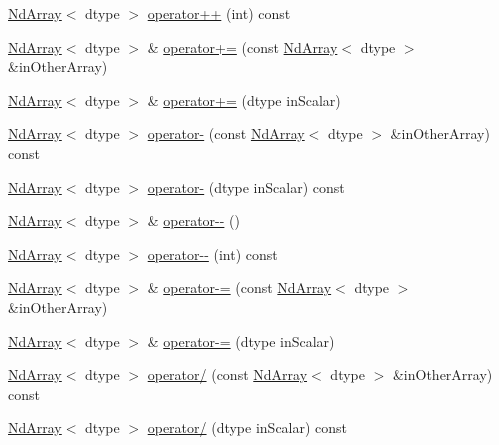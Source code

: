 \begin{DoxyCompactItemize}
\mbox{\hyperlink{class_num_c_1_1_nd_array}{Nd\+Array}}$<$ dtype $>$ \mbox{\hyperlink{class_num_c_1_1_nd_array_a47f9898e6fbe353942d90ed1f37ff79a}{operator++}} (int) const
\item 
\mbox{\hyperlink{class_num_c_1_1_nd_array}{Nd\+Array}}$<$ dtype $>$ \& \mbox{\hyperlink{class_num_c_1_1_nd_array_ada038e83835f7cdcb8173ab7e40a7805}{operator+=}} (const \mbox{\hyperlink{class_num_c_1_1_nd_array}{Nd\+Array}}$<$ dtype $>$ \&in\+Other\+Array)
\item 
\mbox{\hyperlink{class_num_c_1_1_nd_array}{Nd\+Array}}$<$ dtype $>$ \& \mbox{\hyperlink{class_num_c_1_1_nd_array_adf334fdf113d91cea91d7b8bf68b7291}{operator+=}} (dtype in\+Scalar)
\item 
\mbox{\hyperlink{class_num_c_1_1_nd_array}{Nd\+Array}}$<$ dtype $>$ \mbox{\hyperlink{class_num_c_1_1_nd_array_aa5625d7239485a21fd2cc59cec55dfb2}{operator-\/}} (const \mbox{\hyperlink{class_num_c_1_1_nd_array}{Nd\+Array}}$<$ dtype $>$ \&in\+Other\+Array) const
\item 
\mbox{\hyperlink{class_num_c_1_1_nd_array}{Nd\+Array}}$<$ dtype $>$ \mbox{\hyperlink{class_num_c_1_1_nd_array_a3a7f3f151033d72f08d1a0875e7f0c7f}{operator-\/}} (dtype in\+Scalar) const
\item 
\mbox{\hyperlink{class_num_c_1_1_nd_array}{Nd\+Array}}$<$ dtype $>$ \& \mbox{\hyperlink{class_num_c_1_1_nd_array_a3570e7df7c2202a6a8a5f5770f132ba3}{operator-\/-\/}} ()
\item 
\mbox{\hyperlink{class_num_c_1_1_nd_array}{Nd\+Array}}$<$ dtype $>$ \mbox{\hyperlink{class_num_c_1_1_nd_array_ae2cf6f24f8c46ac4b7409b09ecc69b0f}{operator-\/-\/}} (int) const
\item 
\mbox{\hyperlink{class_num_c_1_1_nd_array}{Nd\+Array}}$<$ dtype $>$ \& \mbox{\hyperlink{class_num_c_1_1_nd_array_a2ac18779cb518cfa4dcdff53065426e7}{operator-\/=}} (const \mbox{\hyperlink{class_num_c_1_1_nd_array}{Nd\+Array}}$<$ dtype $>$ \&in\+Other\+Array)
\item 
\mbox{\hyperlink{class_num_c_1_1_nd_array}{Nd\+Array}}$<$ dtype $>$ \& \mbox{\hyperlink{class_num_c_1_1_nd_array_a96520616f12f0a65f380aabd0e8a8e4e}{operator-\/=}} (dtype in\+Scalar)
\item 
\mbox{\hyperlink{class_num_c_1_1_nd_array}{Nd\+Array}}$<$ dtype $>$ \mbox{\hyperlink{class_num_c_1_1_nd_array_a931a3c3251279020beab2c1f198283a7}{operator/}} (const \mbox{\hyperlink{class_num_c_1_1_nd_array}{Nd\+Array}}$<$ dtype $>$ \&in\+Other\+Array) const
\item 
\mbox{\hyperlink{class_num_c_1_1_nd_array}{Nd\+Array}}$<$ dtype $>$ \mbox{\hyperlink{class_num_c_1_1_nd_array_ae650e8fc96a390cc8e1d159c45c5fd1a}{operator/}} (dtype in\+Scalar) const

\end{DoxyCompactItemize}
